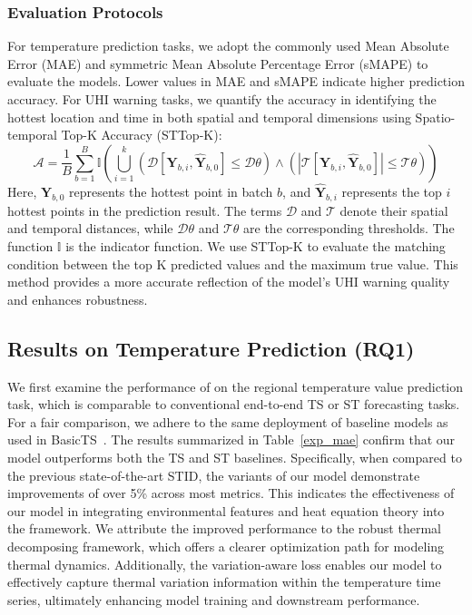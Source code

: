 \subsubsection{Evaluation Protocols}
For temperature prediction tasks, we adopt the commonly used Mean Absolute Error (MAE) and symmetric Mean Absolute Percentage Error (sMAPE) to evaluate the models. Lower values in MAE and sMAPE indicate higher prediction accuracy. For UHI warning tasks, we quantify the accuracy in identifying the hottest location and time in both spatial and temporal dimensions using Spatio-temporal Top-K Accuracy (STTop-K):
\begin{equation}
\mathcal{A}= \frac{1}{B} \sum_{b=1}^{B} \mathbb{I}\left( \bigcup_{i=1}^{k} \left( \mathcal{D}[\mathbf{Y}_{b, i}, \hat{\mathbf{Y}}_{b, 0}] \leq \mathcal{D}{\theta} \right) \land \left( \left| \mathcal{T}[\mathbf{Y}_{b, i}, \hat{\mathbf{Y}}_{b, 0}] \right| \leq \mathcal{T}{\theta} \right) \right)
\end{equation}
Here, $\mathbf{Y}_{b, 0}$ represents the hottest point in batch $b$, and $\hat{\mathbf{Y}}_{b, i}$ represents the top $i$ hottest points in the prediction result. The terms $\mathcal{D}$ and $\mathcal{T}$ denote their spatial and temporal distances, while $\mathcal{D}{\theta}$ and $\mathcal{T}{\theta}$ are the corresponding thresholds. The function $\mathbb{I}$ is the indicator function. We use STTop-K to evaluate the matching condition between the top K predicted values and the maximum true value. This method provides a more accurate reflection of the model's UHI warning quality and enhances robustness.

\subsection{Results on Temperature Prediction (RQ1)} We first examine the performance of \model on the regional temperature value prediction task, which is comparable to conventional end-to-end TS or ST forecasting tasks. For a fair comparison, we adhere to the same deployment of baseline models as used in BasicTS~\cite{shao2024exploring}.
The results summarized in Table~\ref{exp_mae} confirm that our model outperforms both the TS and ST baselines. Specifically, when compared to the previous state-of-the-art STID, the variants of our model demonstrate improvements of over 5\% across most metrics. This indicates the effectiveness of our model in integrating environmental features and heat equation theory into the framework. We attribute the improved performance to the robust thermal decomposing framework, which offers a clearer optimization path for modeling thermal dynamics. Additionally, the variation-aware loss enables our model to effectively capture thermal variation information within the temperature time series, ultimately enhancing model training and downstream performance.

